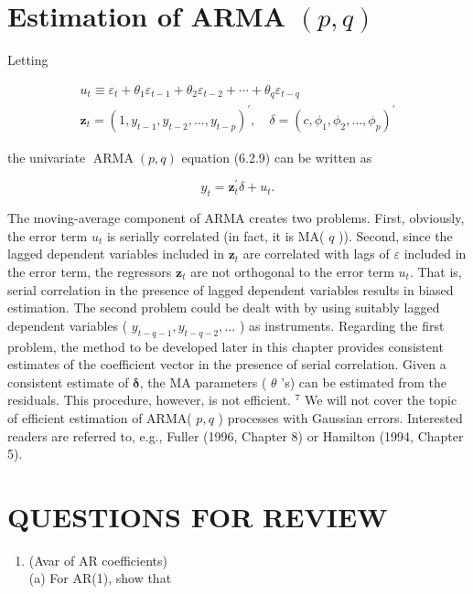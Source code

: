 \documentclass[10pt]{article}
\begin{document}
\section*{Estimation of ARMA $(p, q)$}
Letting

$$
\begin{gathered}
u_{t} \equiv \varepsilon_{t}+\theta_{1} \varepsilon_{t-1}+\theta_{2} \varepsilon_{t-2}+\cdots+\theta_{q} \varepsilon_{t-q} \\
\mathbf{z}_{t}=\left(1, y_{t-1}, y_{t-2}, \ldots, y_{t-p}\right)^{\prime}, \quad \delta=\left(c, \phi_{1}, \phi_{2}, \ldots, \phi_{p}\right)^{\prime}
\end{gathered}
$$

the univariate $\operatorname{ARMA}(p, q)$ equation (6.2.9) can be written as


\begin{equation*}
y_{t}=\mathbf{z}_{t}^{\prime} \delta+u_{t} . \tag{6.4.13}
\end{equation*}


The moving-average component of ARMA creates two problems. First, obviously, the error term $u_{t}$ is serially correlated (in fact, it is MA( $q$ )). Second, since the lagged dependent variables included in $\mathbf{z}_{t}$ are correlated with lags of $\varepsilon$ included in the error term, the regressors $\mathbf{z}_{t}$ are not orthogonal to the error term $u_{t}$. That is, serial correlation in the presence of lagged dependent variables results in biased estimation. The second problem could be dealt with by using suitably lagged\\
dependent variables ( $y_{t-q-1}, y_{t-q-2}, \ldots$ ) as instruments. Regarding the first problem, the method to be developed later in this chapter provides consistent estimates of the coefficient vector in the presence of serial correlation. Given a consistent estimate of $\boldsymbol{\delta}$, the MA parameters ( $\theta$ 's) can be estimated from the residuals. This procedure, however, is not efficient. ${ }^{7}$ We will not cover the topic of efficient estimation of ARMA( $p, q$ ) processes with Gaussian errors. Interested readers are referred to, e.g., Fuller (1996, Chapter 8) or Hamilton (1994, Chapter 5).

\section*{QUESTIONS FOR REVIEW}
\begin{enumerate}
  \item (Avar of AR coefficients)\\
(a) For AR(1), show that
\end{enumerate}
\end{document}
